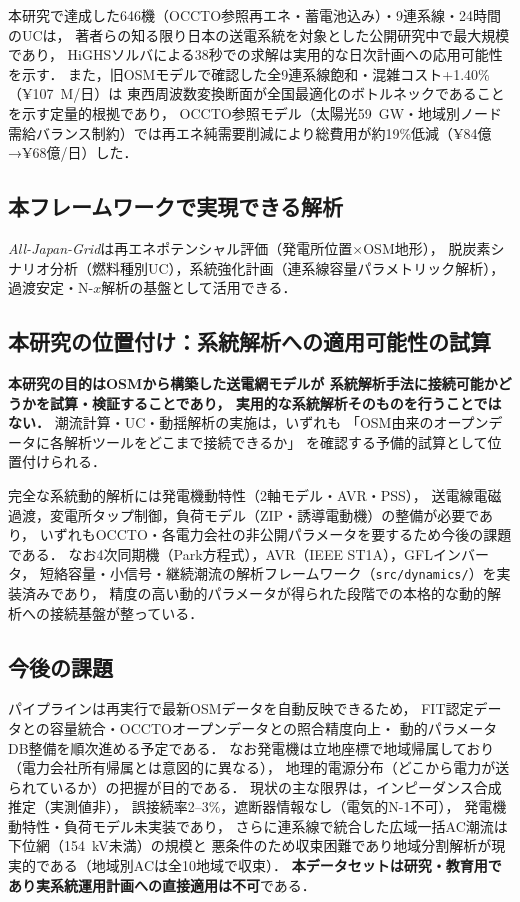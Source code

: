 \documentclass[fleqn]{ieej}
\begin{document}
本研究で達成した646機（OCCTO参照再エネ・蓄電池込み）・9連系線・24時間のUCは，
著者らの知る限り日本の送電系統を対象とした公開研究中で最大規模であり，
HiGHSソルバによる38秒での求解は実用的な日次計画への応用可能性を示す．
また，旧OSMモデルで確認した全9連系線飽和・混雑コスト+1.40\%（¥107~M/日）は
東西周波数変換断面が全国最適化のボトルネックであることを示す定量的根拠であり，
OCCTO参照モデル（太陽光59~GW・地域別ノード需給バランス制約）では再エネ純需要削減により総費用が約19\%低減（¥84億→¥68億/日）した．

\subsection{本フレームワークで実現できる解析}

\textit{All-Japan-Grid}は再エネポテンシャル評価（発電所位置×OSM地形），
脱炭素シナリオ分析（燃料種別UC），系統強化計画（連系線容量パラメトリック解析），
過渡安定・N-$x$解析の基盤として活用できる．

\subsection{本研究の位置付け：系統解析への適用可能性の試算}

\textbf{本研究の目的はOSMから構築した送電網モデルが
系統解析手法に接続可能かどうかを試算・検証することであり，
実用的な系統解析そのものを行うことではない．}
潮流計算・UC・動揺解析の実施は，いずれも
「OSM由来のオープンデータに各解析ツールをどこまで接続できるか」
を確認する予備的試算として位置付けられる．

完全な系統動的解析には発電機動特性（2軸モデル・AVR・PSS），
送電線電磁過渡，変電所タップ制御，負荷モデル（ZIP・誘導電動機）の整備が必要であり，
いずれもOCCTO・各電力会社の非公開パラメータを要するため今後の課題である．
なお4次同期機（Park方程式），AVR（IEEE ST1A），GFLインバータ，
短絡容量・小信号・継続潮流の解析フレームワーク（\texttt{src/dynamics/}）を実装済みであり，
精度の高い動的パラメータが得られた段階での本格的な動的解析への接続基盤が整っている．

\subsection{今後の課題}

パイプラインは再実行で最新OSMデータを自動反映できるため，
FIT認定データとの容量統合・OCCTOオープンデータとの照合精度向上・
動的パラメータDB整備を順次進める予定である．
なお発電機は立地座標で地域帰属しており（電力会社所有帰属とは意図的に異なる），
地理的電源分布（どこから電力が送られているか）の把握が目的である．
現状の主な限界は，インピーダンス合成推定（実測値非），
誤接続率2--3\%，遮断器情報なし（電気的N-1不可），
発電機動特性・負荷モデル未実装であり，
さらに連系線で統合した広域一括AC潮流は下位網（154~kV未満）の規模と
悪条件のため収束困難であり地域分割解析が現実的である（地域別ACは全10地域で収束）．
\textbf{本データセットは研究・教育用であり実系統運用計画への直接適用は不可}である．
\end{document}
